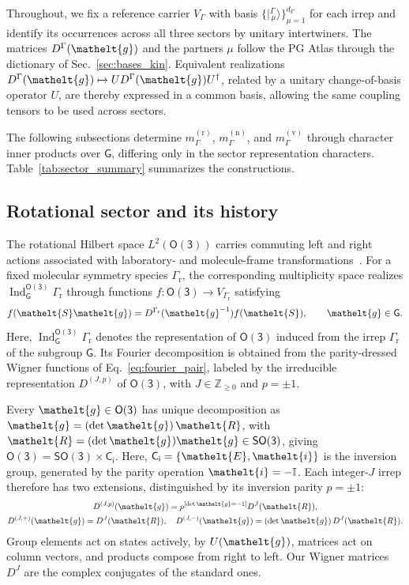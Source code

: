 \documentclass[
  reprint,
  aps,
  prx,
  superscriptaddress,
  amsmath,
  amssymb,
  longbibliography
]{revtex4-2}
\newcommand{\eltfont}[1]{{\let\sigma\eltsigma\mathelt{#1}}}
\newcommand{\grp}[1]{\mathsf{#1}}
\newcommand{\elt}[1]{\eltfont{#1}}
\newcommand{\dirprod}{\times}
\newcommand{\iverson}[1]{[#1]}
\newcommand{\Ind}[2]{\operatorname{Ind}_{#1}^{#2}}
\newcommand{\irrJp}[2]{D^{(#1,#2)}}
\newcommand{\irket}[2]{\bigl\lvert{}^{#1}_{\,#2}\bigr\rangle}
\newcommand{\gel}{\elt{g}}             %
\newcommand{\rotpart}{\elt{R}}         %
\newcommand{\orient}{\elt{S}}          %
\newcommand{\parity}{p}               %
\providecommand{\Grot}{\Gamma_{\mathrm{r}}}
\providecommand{\Othree}{\grp{O(3)}}
\DeclareRobustCommand{\pgatlasfont}[1]{{\fontencoding{OT1}\fontfamily{cmss}\fontshape{n}\selectfont#1}}
\newcommand{\PGAtlas}{\pgatlasfont{PG Atlas}}
\begin{document}
Throughout, we fix a reference carrier $V_\Gamma$ with basis $\{\irket{\Gamma}{\mu}\}_{\mu=1}^{d_\Gamma}$ for each irrep and identify its occurrences across all three sectors by unitary intertwiners. The matrices $D^\Gamma(\gel)$ and the partners $\mu$ follow the \PGAtlas{} through the dictionary of Sec.~\ref{sec:bases_kin}. Equivalent realizations $D^\Gamma(\gel)\mapsto U D^\Gamma(\gel)U^\dagger$, related by a unitary change-of-basis operator $U$, are thereby expressed in a common basis, allowing the same coupling tensors to be used across sectors.

The following subsections determine $m^{(\mathrm{r})}_\Gamma$, $m^{(\mathrm{n})}_\Gamma$, and $m^{(\mathrm{v})}_\Gamma$ through character inner products over $\grp{G}$, differing only in the sector representation characters. Table~\ref{tab:sector_summary} summarizes the constructions.



\subsection{Rotational sector and its history}
\label{sec:rot_sector}

The rotational Hilbert space \(L^2(\Othree)\) carries commuting left and right actions associated with laboratory- and molecule-frame transformations~\cite{Harter1978}. For a fixed molecular symmetry species \(\Grot\), the corresponding multiplicity space realizes \(\Ind{\grp{G}}{\Othree}\Grot\) through functions \(f:\Othree\rightarrow V_{\Grot}\) satisfying 
\[
f(\orient\gel)=D^{\Grot}(\gel^{-1})f(\orient),
\qquad \gel\in\grp{G}.
\] 
Here, $\operatorname{Ind}_{\grp G}^{\Othree}\Grot$ denotes the representation of $\Othree$ induced from the irrep $\Grot$ of the subgroup $\grp{G}$. Its Fourier decomposition is obtained from the parity-dressed Wigner functions of Eq.~\eqref{eq:fourier_pair}, labeled by the irreducible representation \(\irrJp{J}{\parity}\) of \(\grp{O(3)}\), with \(J\in\mathbb Z_{\ge0}\) and \(\parity=\pm1\).

Every \(\gel\in\grp{O(3)}\) has unique decomposition as \(\gel=(\det\gel)\,\rotpart\), with \(\rotpart=(\det \gel)\gel \in\grp{SO(3)}\), giving \(\grp{O(3)}=\grp{SO(3)}\dirprod\grp{C_{i}}\). Here, $\grp{C_{i}}=\{\elt{E},\elt{i}\}$ is the inversion group, generated by the parity operation $\elt{i}=-\mathbb I$. Each integer-$J$ irrep therefore has two extensions, distinguished by its inversion parity $\parity=\pm1$:
\begin{equation}
\begin{gathered}
\irrJp{J}{\parity}(\gel)=\parity^{\iverson{\det\gel=-1}}D^J(\rotpart),
\\
\irrJp{J}{+}(\gel)=D^J(\rotpart),\quad \irrJp{J}{-}(\gel)=(\det \gel)\,D^J(\rotpart).
\end{gathered}
\label{eq:O3_wigner}
\end{equation}
Group elements act on states actively, by $U(\gel)$, matrices act on column vectors, and products compose from right to left. Our Wigner matrices $D^J$ are the complex conjugates of the standard ones.
\end{document}
